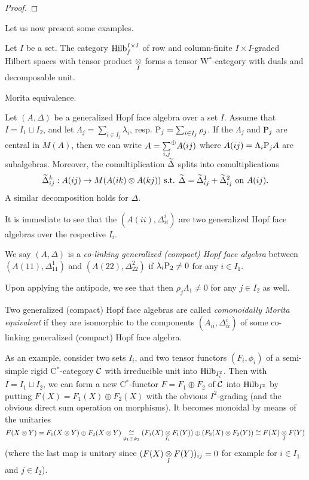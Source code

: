 \begin{proof}

\end{proof}


Let us now present some examples.

\begin{Exa} Let $I$ be a set. The category $\mathrm{Hilb}_f^{I\times I}$ of row and column-finite $I\times I$-graded Hilbert spaces with tensor product $\underset{I}{\otimes}$ forms a tensor W$^*$-category with duals and decomposable unit. 
\end{Exa}

\begin{Exa} Morita equivalence.
\end{Exa}

Let $(A,\Delta)$ be a generalized Hopf face algebra over a set $I$. Assume that $I = I_1\sqcup I_2$, and let $\Lambda_j = \sum_{i\in I_j}\lambda_i$, resp. $\mathrm{P}_j = \sum_{i\in I_j} \rho_j$. If the $\Lambda_j$ and $\mathrm{P}_j$ are central in $M(A)$, then we can write $A = \underset{i,j}{\sum}^{\oplus} A(ij)$ where $A(ij) = \Lambda_i\mathrm{P}_jA$ are subalgebras. Moreover, the comultiplication $\widetilde{\Delta}$ splits into comultiplications \[\widetilde{\Delta}_{ij}^k:A(ij)\rightarrow M(A(ik)\otimes A(kj))\textrm{ s.t. } \widetilde{\Delta} = \widetilde{\Delta}_{ij}^1 +\widetilde{\Delta}_{ij}^2 \textrm{ on }A(ij).\] A similar decomposition holds for $\Delta$.

It is immediate to see that the $(A(ii),\Delta_{ii}^i)$ are two generalized Hopf face algebras over the respective $I_i$.

\begin{Def} We say $(A,\Delta)$ is a \emph{co-linking generalized (compact) Hopf face algebra} between $(A(11),\Delta_{11}^1)$ and $(A(22),\Delta_{22}^2)$ if $\lambda_i\mathrm{P}_2\neq 0$ for any $i\in I_1$.
\end{Def}

Upon applying the antipode, we see that then $\rho_j\Lambda_1\neq 0$ for any $j\in I_2$ as well.

\begin{Def} Two generalized (compact) Hopf face algebras are called \emph{comonoidally Morita equivalent} if they are isomorphic to the components $(A_{ii},\Delta_{ii}^i)$ of some co-linking generalized (compact) Hopf face algebra.\end{Def}

As an example, consider two sets $I_i$, and two tensor functors $(F_i,\phi_i)$ of a semi-simple rigid C$^*$-category $\mathcal{C}$ with irreducible unit into $\mathrm{Hilb}_{I_i^2}$. Then with $I= I_1\sqcup I_2$, we can form a new C$^*$-functor $F=F_1\oplus F_2$ of $\mathcal{C}$ into $\mathrm{Hilb}_{I^2}$ by putting $F(X) = F_1(X)\oplus F_2(X)$ with the obvious $I^2$-grading (and the obvious direct sum operation on morphisms). It becomes monoidal by means of the unitaries \[F(X\otimes Y) = F_1(X\otimes Y)\oplus F_2(X\otimes Y) \underset{\phi_1\oplus \phi_2}{\cong} (F_1(X)\underset{I_1}{\otimes} F_1(Y)) \oplus (F_2(X)\otimes F_2(Y)) \cong F(X)\underset{I}{\otimes} F(Y)\] (where the last map is unitary since $(F(X)\underset{I}{\otimes} F(Y))_{ij}=0$ for example for $i\in I_1$ and $j\in I_2$).

